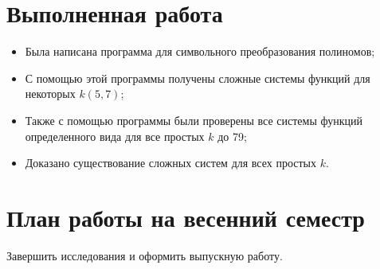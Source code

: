 \documentclass [12pt, a4paper] {extarticle}
\begin{document}
\section{Выполненная работа}
\begin{itemize}
    \item Была написана программа для символьного преобразования полиномов;

    \item С помощью этой программы получены сложные системы функций для
        некоторых $k (5,7)$; 
        
    \item Также с помощью программы были проверены все системы функций
        определенного вида для все простых $k$ до 79;

    \item Доказано существование сложных систем для всех простых $k$.
\end{itemize}

\section{План работы на весенний семестр}
Завершить исследования и оформить выпускную работу.

\makeatletter
\renewcommand*{\@biblabel}[1]{\hfill#1.}
\makeatother

\newpage
{}
\end{document}
